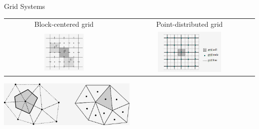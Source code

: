 \documentclass[handout]{beamer}
{
\usepackage{fullpage}
\usepackage{hyperref}
\usepackage{amssymb} 
}
\begin{document}
\begin{frame}{Grid Systems}
\centering
\begin{tabular}{cc}
Block-centered grid & Point-distributed grid \\
\includegraphics[width=0.35\textwidth]{figures/cellQuad.png}
&
\includegraphics[width=0.51\textwidth]{figures/pointQuad.png}
\end{tabular}
\includegraphics[width=0.5\textwidth]{figures/cellcentered.png}
\end{frame}
\end{document}
